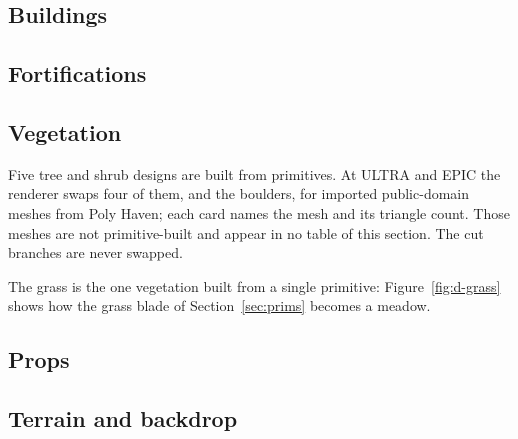 \clearpage\subsection{Buildings}
\designcardsBuildings

\clearpage\subsection{Fortifications}
\designcardsFortifications

\clearpage\subsection{Vegetation}
Five tree and shrub designs are built from primitives. At ULTRA and EPIC the renderer swaps four of them, and the
boulders, for imported public-domain meshes from Poly Haven; each card names the mesh and its triangle count. Those meshes are
not primitive-built and appear in no table of this section. The cut branches are never swapped.
\designcardsVegetation

The grass is the one vegetation built from a single primitive: Figure~\ref{fig:d-grass} shows how the grass blade of
Section~\ref{sec:prims} becomes a meadow.
\grasscard

\clearpage\subsection{Props}
\designcardsProps

\clearpage\subsection{Terrain and backdrop}
\designcardsTerrainAndBackdrop
